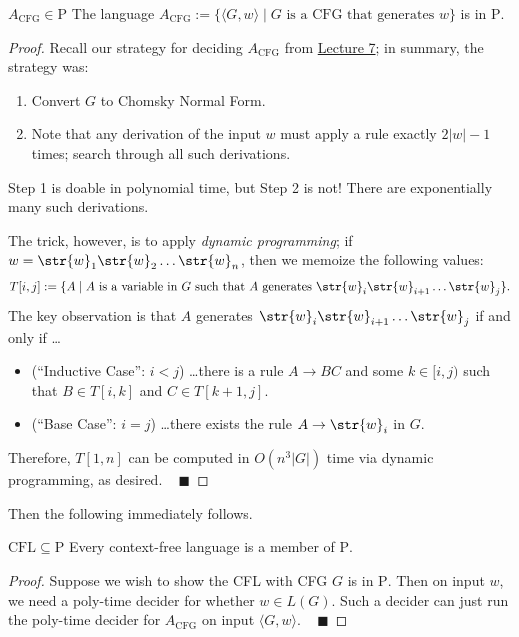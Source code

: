\begin{theorem}{$A_{\mathrm{CFG}} \in \mathrm{P}$}
    The language $A_{\mathrm{CFG}} := \{
        \langle G, w \rangle \mid
        G \text{ is a CFG that generates } w
    \}$ is in $\mathrm{P}$.
\end{theorem}

\begin{proof}
    Recall our strategy for deciding $A_{\mathrm{CFG}}$
    from \href{/18.404/lectures/7/#algorithms-on-grammars-and-turing-machines-a-cfg-e-cfg-eq-cfg-a-tm}{Lecture 7};
    in summary, the strategy was:
    \begin{enumerate}
        \item Convert $G$ to Chomsky Normal Form.
        \item Note that any derivation of the input $w$
        must apply a rule exactly $2|w| - 1$ times;
        search through all such derivations.
    \end{enumerate}
    Step 1 is doable in polynomial time, but Step 2 is not!
    There are exponentially many such derivations.

    The trick, however, is to apply \emph{dynamic programming};
    if $w = \str{w}_1\str{w}_2\dots\str{w}_n$, then
    we memoize the following values:
    \[
    T[i, j] := \{A \mid A \text{ is a variable in } G
    \text{ such that } A \text{ generates }
    \str{w}_i\str{w}_{i + 1}\dots \str{w}_j\}.
    \]
    The key observation is that
    $A$ generates $\str{w}_i\str{w}_{i + 1}\dots \str{w}_j$
    if and only if \dots
    \begin{itemize}
        \item (``Inductive Case'': $i < j$)
        \dots there is a rule $A \to BC$ and some $k \in [i, j)$
        such that $B \in T[i, k]$ and $C \in T[k + 1, j]$.
        \item (``Base Case'': $i = j$)
        \dots there exists the rule $A \to \str{w}_i$ in $G$.
    \end{itemize}
    Therefore, $T[1, n]$ can be computed in $O(n^3|G|)$ time
    via dynamic programming, as desired. ~ $\blacksquare$
\end{proof}

Then the following immediately follows.

\begin{theorem}{$\mathrm{CFL} \subseteq \mathrm{P}$}
    Every context-free language is a member of $\mathrm{P}$.
\end{theorem}

\begin{proof}
    Suppose we wish to show the CFL with CFG $G$ is in $\mathrm{P}$.
    Then on input $w$, we need a poly-time decider
    for whether $w \in L(G)$.
    Such a decider can just
    run the poly-time decider for $A_{\mathrm{CFG}}$
    on input $\langle G, w \rangle$.
    ~ $\blacksquare$
\end{proof}

